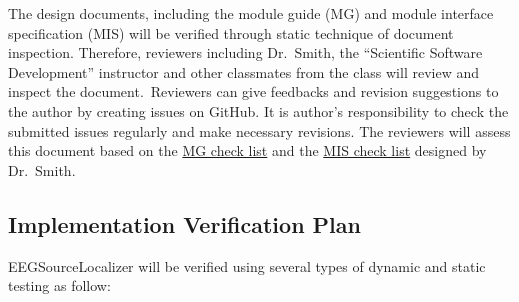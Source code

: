 \documentclass[12pt, titlepage]{article}
\renewcommand{\progname}{EEGSourceLocalizer}
\begin{document}
The design documents, including the module guide (MG) and module interface specification (MIS) will be verified through static technique of document inspection. Therefore, reviewers including Dr.\ Smith, the  \enquote{Scientific Software Development}  instructor and other classmates from the class will review and inspect the document.\ Reviewers can give feedbacks and revision suggestions to the author by creating issues on GitHub. It is author’s responsibility to check the submitted issues regularly and make necessary revisions. The reviewers will assess this document based on the \href{https://gitlab.cas.mcmaster.ca/smiths/cas741/-/blob/master/BlankProjectTemplate/docs/Design/MG/MG-Checklist.pdf}{MG check list} and the \href{https://gitlab.cas.mcmaster.ca/smiths/cas741/-/blob/master/BlankProjectTemplate/docs/Design/MIS/MIS-Checklist.pdf}{MIS check list} designed by Dr.\ Smith.


\subsection{Implementation Verification Plan}

\progname{} will be verified using several types of dynamic and static testing as follow:
\end{document}
